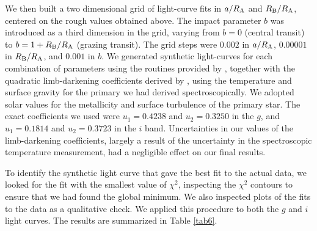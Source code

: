 \documentclass[12pt, preprint]{aastex}
\begin{document}
We then built a two dimensional grid of light-curve fits in $a/R_{\rm
A}$ and $R_{\rm B}/R_{\rm A}$, centered on the rough values obtained
above. The impact parameter $b$ was introduced as a third dimension in
the grid, varying from $b=0$ (central transit) to $b=1+R_{\rm
B}/R_{\rm A}$ (grazing transit). The grid steps were $0.002$ in
$a/R_{\rm A}$, $0.00001$ in $R_{\rm B}/R_{\rm A}$, and $0.001$ in $b$. We
generated synthetic light-curves for each combination of parameters
using the routines provided by \citet{mandel2002}, together with the quadratic
limb-darkening coefficients derived by \citet{claret2004}, using the
temperature and surface gravity for the primary we had derived
spectroscopically. We adopted solar values for the metallicity and
surface turbulence of the primary star. The exact coefficients we used were $u_1=0.4238$ and $u_2=0.3250$ in the $g$, and $u_1=0.1814$ and $u_2=0.3723$ in the $i$ band. Uncertainties in our values of the limb-darkening coefficients, largely a result of the uncertainty in the spectroscopic temperature measurement, had a negligible effect on our final results. 

To identify the synthetic light curve that gave the best fit to the
actual data, we looked for the fit with the smallest value of
$\chi^2$, inspecting the $\chi^2$ contours to ensure that we had found
the global minimum. We also inspected plots of the fits to the data
as a qualitative check. We applied this procedure to both the $g$ and
$i$ light curves. The results are summarized in Table \ref{tab6}.
\end{document}
